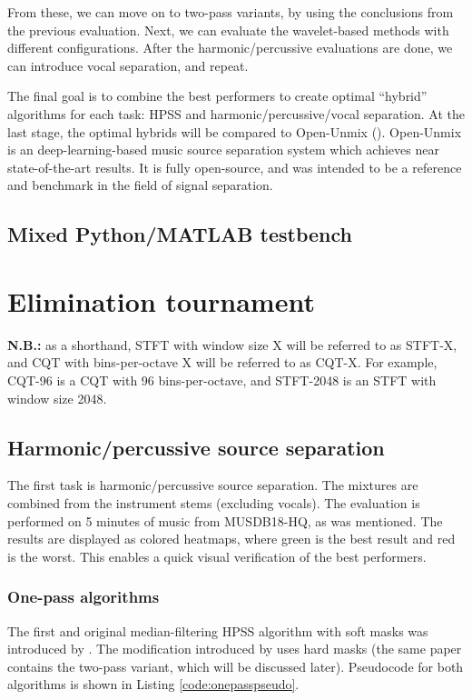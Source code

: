 \documentclass[10pt,letter]{article}
\begin{document}
From these, we can move on to two-pass variants, by using the conclusions from the previous evaluation. Next, we can evaluate the wavelet-based methods with different configurations. After the harmonic/percussive evaluations are done, we can introduce vocal separation, and repeat.

The final goal is to combine the best performers to create optimal ``hybrid'' algorithms for each task: HPSS and harmonic/percussive/vocal separation. At the last stage, the optimal hybrids will be compared to Open-Unmix (\cite{umx}). Open-Unmix is an deep-learning-based music source separation system which achieves near state-of-the-art results. It is fully open-source, and was intended to be a reference and benchmark in the field of signal separation.

\subsection{Mixed Python/MATLAB testbench}

\section{Elimination tournament}
\label{sec:elim}

\textbf{N.B.:} as a shorthand, STFT with window size X will be referred to as STFT-X, and CQT with bins-per-octave X will be referred to as CQT-X. For example, CQT-96 is a CQT with 96 bins-per-octave, and STFT-2048 is an STFT with window size 2048.

\subsection{Harmonic/percussive source separation}

The first task is harmonic/percussive source separation. The mixtures are combined from the instrument stems (excluding vocals). The evaluation is performed on 5 minutes of music from MUSDB18-HQ, as was mentioned. The results are displayed as colored heatmaps, where green is the best result and red is the worst. This enables a quick visual verification of the best performers.

\subsubsection{One-pass algorithms}

The first and original median-filtering HPSS algorithm with soft masks was introduced by \citet{fitzgerald1}. The modification introduced by \citet{driedger} uses hard masks (the same paper contains the two-pass variant, which will be discussed later). Pseudocode for both algorithms is shown in Listing \ref{code:onepasspseudo}.
\end{document}

